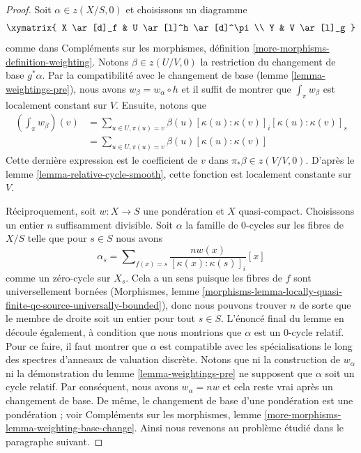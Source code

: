 \begin{proof} 
Soit  $\alpha \in z(X/S, 0)$  et choisissons un diagramme 
$$
\xymatrix{
X \ar[d]_f & U \ar[l]^h \ar[d]^\pi \\
Y & V \ar[l]_g
}
$$
 comme dans Compléments sur les morphismes, définition \ref{more-morphisms-definition-weighting}. 
Notons  $\beta \in z(U/V, 0)$  la restriction du changement de base  $g^*\alpha$.
 Par la compatibilité avec le changement de base (lemme \ref{lemma-weightings-pre}), 
nous avons  $w_\beta = w_\alpha \circ h$  et il suffit de montrer que  
$\int_\pi w_\beta$  est localement constant sur  $V$. Ensuite, notons que 
\begin{align*} 
\left( \int_\pi w_\beta \right)(v) 
& = 
\sum\nolimits_{u \in U, \pi(u) = v} 
\beta(u) [\kappa(u) : \kappa(v)]_i [\kappa(u) : \kappa(v)]_s \\
& = 
\sum\nolimits_{u \in U, \pi(u) = v} \beta(u)[\kappa(u) : \kappa(v)] 
\end{align*} 
Cette dernière expression est le coefficient de  $v$  dans  $\pi_*\beta \in z(V/V, 0)$. 
D'après le lemme \ref{lemma-relative-cycle-smooth}, cette fonction est localement 
constante sur $V$. 

\medskip\noindent
 Réciproquement, soit  $w : X \to S$  une pondération et  $X$  quasi-compact.
 Choisissons un entier  $n$ suffisamment divisible. Soit  $\alpha$  la famille 
de  $0$-cycles sur les fibres de  $X/S$  telle que pour $s \in S$  nous avons 
$$
\alpha_s =
\sum\nolimits_{f(x) = s} \frac{n w(x)}{[\kappa(x) : \kappa(s)]_i} [x]
$$
 comme un zéro-cycle sur  $X_s$.
 Cela a un sens puisque les fibres de $f$  sont universellement bornées
 (Morphismes, lemme 
\ref{morphisms-lemma-locally-quasi-finite-qc-source-universally-bounded}), donc 
nous pouvons trouver  $n$  de sorte que le membre de droite soit un entier pour 
tout  $s \in S$. L'énoncé final du lemme en découle également, à condition que nous montrions
 que  $\alpha$  est un  $0$-cycle relatif. Pour ce faire, il faut 
montrer que  $\alpha$  est compatible avec les spécialisations le long des spectres
 d'anneaux de valuation discrète. Notons que ni la construction de $w_\alpha$
  ni la démonstration du lemme \ref{lemma-weightings-pre} ne supposent que  $\alpha$
 soit un cycle relatif. Par conséquent, nous avons  $w_\alpha = nw$  et cela reste vrai 
après un changement de base. De même, le changement de base d'une pondération est une
 pondération ; voir 
Compléments sur les morphismes, lemme \ref{more-morphisms-lemma-weighting-base-change}. 
Ainsi nous revenons au problème étudié dans le paragraphe suivant. 


\end{proof}
